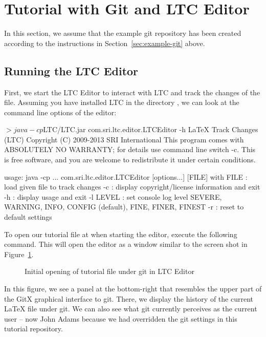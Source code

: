 \section{Tutorial with Git and LTC Editor} \label{sec:tutorial-git}

In this section, we assume that the example git repository has been created according to the instructions in Section~\ref{sec:example-git} above.

\subsection{Running the LTC Editor}

First, we start the LTC Editor to interact with LTC and track the changes of the file.  Assuming you have installed LTC in the directory , we can look at the command line options of the editor:
\begin{CodeVerbatim}[commandchars=\\\{\}]
$> java -cp $LTC/LTC.jar com.sri.ltc.editor.LTCEditor -h
LaTeX Track Changes (LTC)  Copyright (C) 2009-2013  SRI International
This program comes with ABSOLUTELY NO WARRANTY; for details use command line switch -c.
This is free software, and you are welcome to redistribute it under certain conditions.

usage: java -cp ... com.sri.ltc.editor.LTCEditor [options...] [FILE] 
with
 FILE     : load given file to track changes
 -c       : display copyright/license information and exit
 -h       : display usage and exit
 -l LEVEL : set console log level
            SEVERE, WARNING, INFO, CONFIG (default), FINE, FINER, FINEST
 -r       : reset to default settings
\end{CodeVerbatim}

To open our tutorial file at  when starting the editor, execute the following command.  This will open the editor as a window similar to the screen shot in Figure~\ref{fig:editor-open}.
\begin{figure}[t]
\centering
{}
\caption{Initial opening of tutorial file under git in LTC Editor} \label{fig:editor-open}
\end{figure}
In this figure, we see a panel at the bottom-right that resembles the upper part of the GitX graphical interface to git.  There, we display the history of the current LaTeX file under git.  We can also see what git currently perceives as the current user -- now John Adams because we had overridden the git settings in this tutorial repository.


